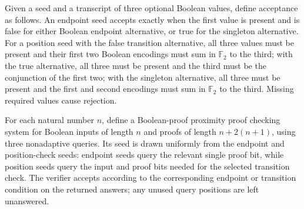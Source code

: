 \begin{definition}
\label{FABL.completeQuadraticLinearTranscriptAccept}
\leanok
{}
Given a seed and a transcript of three optional Boolean values, define acceptance as
follows. An endpoint seed accepts exactly when the first value is present and is false
for either Boolean endpoint alternative, or true for the singleton alternative. For a
position seed with the false transition alternative, all three values must be present
and their first two Boolean encodings must sum in $\mathbb F_2$ to the third; with the
true alternative, all three must be present and the third must be the conjunction of the
first two; with the singleton alternative, all three must be present and the first and
second encodings must sum in $\mathbb F_2$ to the third. Missing required values cause
rejection.
\end{definition}

\begin{definition}
\label{FABL.completeQuadraticLinearPCPPSystem}
\leanok
{}
For each natural number $n$, define a Boolean-proof proximity proof checking system for
Boolean inputs of length $n$ and proofs of length $n+2(n+1)$, using three nonadaptive
queries. Its seed is drawn uniformly from the endpoint and position-check seeds:
endpoint seeds query the relevant single proof bit, while position seeds query the input
and proof bits needed for the selected transition check. The verifier accepts according
to the corresponding endpoint or transition condition on the returned answers; any
unused query positions are left unanswered.
\end{definition}

